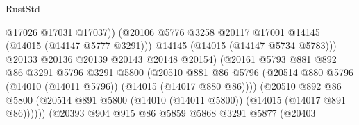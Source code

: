 \begin{lexlean}{RustStd}
\begin{coremodule}
                                            @17026
                                            @17031
                                            @17037))
                                        (@20106
                                          @5776
                                          @3258
                                          @20117
                                          @17001
                                          @14145
                                          (@14015 (@14147 @5777 @3291)))
                                        @14145
                                        (@14015 (@14147 @5734 @5783)))
                                      @20133
                                      @20136
                                      @20139
                                      @20143
                                      @20148
                                      @20154)
                                    (@20161
                                      @5793
                                      @881
                                      @892
                                      @86
                                      @3291
                                      @5796
                                      @3291
                                      @5800
                                      (@20510
                                        @881
                                        @86
                                        @5796
                                        (@20514
                                          @880
                                          @5796
                                          (@14010 (@14011 @5796))
                                          (@14015 (@14017 @880 @86))))
                                      (@20510
                                        @892
                                        @86
                                        @5800
                                        (@20514
                                          @891
                                          @5800
                                          (@14010 (@14011 @5800))
                                          (@14015 (@14017 @891 @86))))))
                                  (@20393
                                    @904
                                    @915
                                    @86
                                    @5859
                                    @5868
                                    @3291
                                    @5877
                                    (@20403

\end{coremodule}
\end{lexlean}
